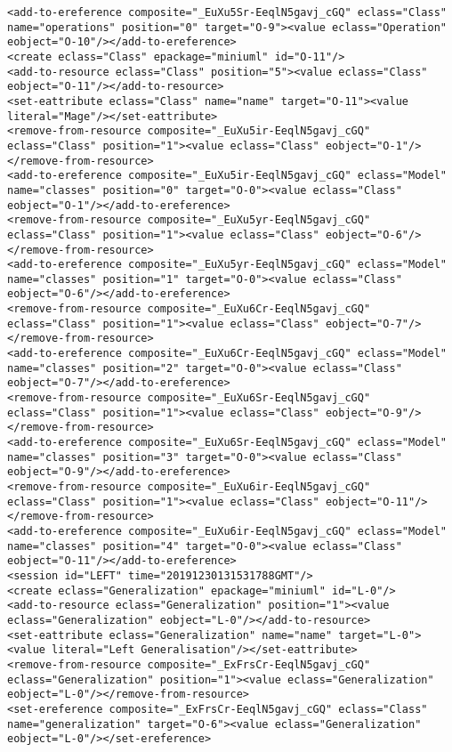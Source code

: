 \begin{lstlisting}[style=cbpfile,caption={Change-based representation of the model in Figure \ref{fig:class_diagram_left}.},label=lst:class_diagram_left_cbpfile]
<add-to-ereference composite="_EuXu5Sr-EeqlN5gavj_cGQ" eclass="Class" name="operations" position="0" target="O-9"><value eclass="Operation" eobject="O-10"/></add-to-ereference>
<create eclass="Class" epackage="miniuml" id="O-11"/>
<add-to-resource eclass="Class" position="5"><value eclass="Class" eobject="O-11"/></add-to-resource>
<set-eattribute eclass="Class" name="name" target="O-11"><value literal="Mage"/></set-eattribute>
<remove-from-resource composite="_EuXu5ir-EeqlN5gavj_cGQ" eclass="Class" position="1"><value eclass="Class" eobject="O-1"/></remove-from-resource>
<add-to-ereference composite="_EuXu5ir-EeqlN5gavj_cGQ" eclass="Model" name="classes" position="0" target="O-0"><value eclass="Class" eobject="O-1"/></add-to-ereference>
<remove-from-resource composite="_EuXu5yr-EeqlN5gavj_cGQ" eclass="Class" position="1"><value eclass="Class" eobject="O-6"/></remove-from-resource>
<add-to-ereference composite="_EuXu5yr-EeqlN5gavj_cGQ" eclass="Model" name="classes" position="1" target="O-0"><value eclass="Class" eobject="O-6"/></add-to-ereference>
<remove-from-resource composite="_EuXu6Cr-EeqlN5gavj_cGQ" eclass="Class" position="1"><value eclass="Class" eobject="O-7"/></remove-from-resource>
<add-to-ereference composite="_EuXu6Cr-EeqlN5gavj_cGQ" eclass="Model" name="classes" position="2" target="O-0"><value eclass="Class" eobject="O-7"/></add-to-ereference>
<remove-from-resource composite="_EuXu6Sr-EeqlN5gavj_cGQ" eclass="Class" position="1"><value eclass="Class" eobject="O-9"/></remove-from-resource>
<add-to-ereference composite="_EuXu6Sr-EeqlN5gavj_cGQ" eclass="Model" name="classes" position="3" target="O-0"><value eclass="Class" eobject="O-9"/></add-to-ereference>
<remove-from-resource composite="_EuXu6ir-EeqlN5gavj_cGQ" eclass="Class" position="1"><value eclass="Class" eobject="O-11"/></remove-from-resource>
<add-to-ereference composite="_EuXu6ir-EeqlN5gavj_cGQ" eclass="Model" name="classes" position="4" target="O-0"><value eclass="Class" eobject="O-11"/></add-to-ereference>
<session id="LEFT" time="20191230131531788GMT"/>
<create eclass="Generalization" epackage="miniuml" id="L-0"/>
<add-to-resource eclass="Generalization" position="1"><value eclass="Generalization" eobject="L-0"/></add-to-resource>
<set-eattribute eclass="Generalization" name="name" target="L-0"><value literal="Left Generalisation"/></set-eattribute>
<remove-from-resource composite="_ExFrsCr-EeqlN5gavj_cGQ" eclass="Generalization" position="1"><value eclass="Generalization" eobject="L-0"/></remove-from-resource>
<set-ereference composite="_ExFrsCr-EeqlN5gavj_cGQ" eclass="Class" name="generalization" target="O-6"><value eclass="Generalization" eobject="L-0"/></set-ereference>

\end{lstlisting}

